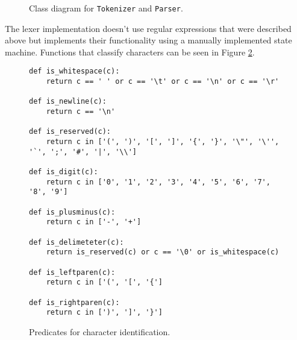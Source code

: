 \begin{figure}[h]
	\centering
\caption{Class diagram for \texttt{Tokenizer} and \texttt{Parser}.}
\label{class-diagram-lexer-parser}
\end{figure}

The lexer implementation doesn't use regular expressions that were described above but implements their functionality using a manually implemented state machine. Functions that classify characters can be seen in Figure \ref{char-predicates}.

\begin{figure}[h]
\begin{verbatim}
def is_whitespace(c):
    return c == ' ' or c == '\t' or c == '\n' or c == '\r'

def is_newline(c):
    return c == '\n'

def is_reserved(c): 
    return c in ['(', ')', '[', ']', '{', '}', '\"', '\'', '`', ';', '#', '|', '\\']

def is_digit(c):
    return c in ['0', '1', '2', '3', '4', '5', '6', '7', '8', '9']

def is_plusminus(c):
    return c in ['-', '+']

def is_delimeteter(c):
    return is_reserved(c) or c == '\0' or is_whitespace(c)

def is_leftparen(c):
	return c in ['(', '[', '{']

def is_rightparen(c):
	return c in [')', ']', '}']
\end{verbatim}
\caption{Predicates for character identification.}
\label{char-predicates}
\end{figure}


